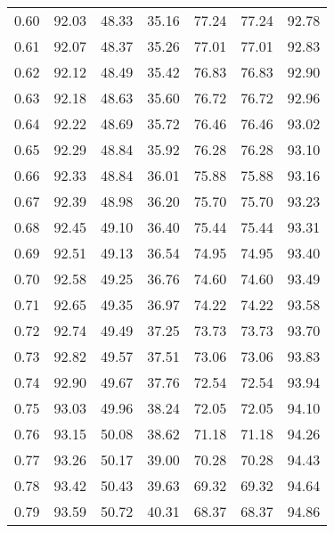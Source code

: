 \begin{tabular}{|c|c|c|c|c|c|c|}
      0.60 &     92.03 &     48.33 &      35.16 &   77.24 &      77.24 &         92.78 \\
      0.61 &     92.07 &     48.37 &      35.26 &   77.01 &      77.01 &         92.83 \\
      0.62 &     92.12 &     48.49 &      35.42 &   76.83 &      76.83 &         92.90 \\
      0.63 &     92.18 &     48.63 &      35.60 &   76.72 &      76.72 &         92.96 \\
      0.64 &     92.22 &     48.69 &      35.72 &   76.46 &      76.46 &         93.02 \\
      0.65 &     92.29 &     48.84 &      35.92 &   76.28 &      76.28 &         93.10 \\
      0.66 &     92.33 &     48.84 &      36.01 &   75.88 &      75.88 &         93.16 \\
      0.67 &     92.39 &     48.98 &      36.20 &   75.70 &      75.70 &         93.23 \\
      0.68 &     92.45 &     49.10 &      36.40 &   75.44 &      75.44 &         93.31 \\
      0.69 &     92.51 &     49.13 &      36.54 &   74.95 &      74.95 &         93.40 \\
      0.70 &     92.58 &     49.25 &      36.76 &   74.60 &      74.60 &         93.49 \\
      0.71 &     92.65 &     49.35 &      36.97 &   74.22 &      74.22 &         93.58 \\
      0.72 &     92.74 &     49.49 &      37.25 &   73.73 &      73.73 &         93.70 \\
      0.73 &     92.82 &     49.57 &      37.51 &   73.06 &      73.06 &         93.83 \\
      0.74 &     92.90 &     49.67 &      37.76 &   72.54 &      72.54 &         93.94 \\
      0.75 &     93.03 &     49.96 &      38.24 &   72.05 &      72.05 &         94.10 \\
      0.76 &     93.15 &     50.08 &      38.62 &   71.18 &      71.18 &         94.26 \\
      0.77 &     93.26 &     50.17 &      39.00 &   70.28 &      70.28 &         94.43 \\
      0.78 &     93.42 &     50.43 &      39.63 &   69.32 &      69.32 &         94.64 \\
      0.79 &     93.59 &     50.72 &      40.31 &   68.37 &      68.37 &         94.86 \\

\end{tabular}
